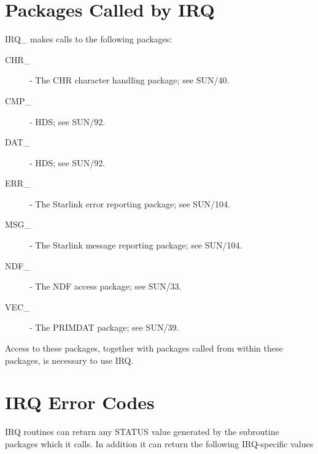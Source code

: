 \section {Packages Called by IRQ}
IRQ\_ makes calls to the following packages:
\begin {description}
\item [CHR\_] - The CHR character handling package; see SUN/40.
\item [CMP\_] - HDS; see SUN/92.
\item [DAT\_] - HDS; see SUN/92.
\item [ERR\_] - The Starlink error reporting package; see SUN/104.
\item [MSG\_] - The Starlink message reporting package; see SUN/104.
\item [NDF\_] - The NDF access package; see SUN/33.
\item [VEC\_] - The PRIMDAT package; see SUN/39.
\end{description}

Access to these packages, together with packages called from within these 
packages, is necessary to use IRQ. 

\section {IRQ Error Codes}
\label {APP:ERRORS}
IRQ routines can return any STATUS value generated by the subroutine packages 
which it calls. In addition it can return the following IRQ-specific values 

